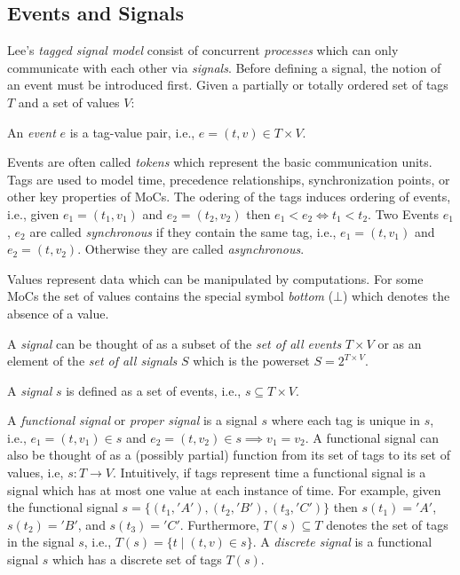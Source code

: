 \subsection{Events and Signals}

Lee's \emph{tagged signal model} consist of concurrent \emph{processes} which
can only communicate with each other via \emph{signals}.
Before defining a signal, the notion of an event must be introduced first.
Given a partially or totally ordered set of tags $T$ and a set of values $V$:
\begin{definition}\label{tsm-event}
An \emph{event} $e$ is a  tag-value pair, i.e., $e = (t,v) \in T \times V$.
\end{definition}
Events are often called \emph{tokens} which represent the basic communication units.
Tags are used to model time, precedence relationships, synchronization points, or
other key properties of MoCs. The odering of the tags induces ordering of events, i.e.,
given $e_1 = (t_1,v_1)$ and $e_2 = (t_2,v_2)$ then $e_1 < e_2 \iff t_1 < t_2$.
Two Events $e_1$, $e_2$ are called \emph{synchronous} if they contain
the same tag, i.e., $e_1 = (t,v_1)$ and $e_2 = (t,v_2)$. Otherwise they
are called \emph{asynchronous}.

Values represent data which can be manipulated by computations.
For some MoCs the set of values contains the special symbol \emph{bottom} ($\bot$)
which denotes the absence of a value.

A \emph{signal} can be thought of as a subset of the \emph{set of all events} $T \times V$ or as
an element of the \emph{set of all signals} $S$ which is the powerset $S = 2^{T \times V}$.
\begin{definition}\label{tsm-signal}
A \emph{signal} $s$ is defined as a set of events, i.e., $s \subseteq T \times V$.
\end{definition}

A \emph{functional signal} or \emph{proper signal} is a signal $s$ where each tag is unique in $s$,
i.e., $e_1 = (t,v_1) \in s$ and $e_2 = (t,v_2) \in s \implies v_1 = v_2$.
A functional signal can also be thought of as a (possibly partial) function 
from its set of tags to its set of values, i.e, $s: T \to V$.
Intuitively, if tags represent time a functional signal is a signal which has
at most one value at each instance of time. For example, 
given the functional signal $s = \{(t_1,'A'),(t_2,'B'),(t_3,'C')\}$ then
$s(t_1) = 'A'$, $s(t_2) = 'B'$, and $s(t_3) = 'C'$.
Furthermore, $T(s) \subseteq T$ denotes the set of tags in the signal $s$,
i.e., $T(s) = \{t \mid (t,v) \in s\}$. A \emph{discrete signal} is a functional
signal $s$ which has a discrete set of tags $T(s)$.

